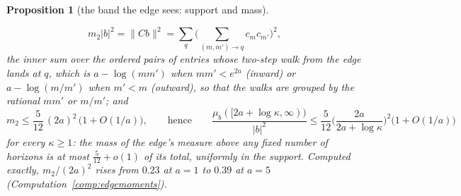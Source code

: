 \documentclass[11pt]{article}
\newtheorem{proposition}[theorem]{Proposition}
\theoremstyle{definition}
\theoremstyle{remark}
\begin{document}
\begin{proposition}[the band the edge sees: support and mass]
\begin{enumerate}
\[
m_2|b|^2=\|Cb\|^2=\sum_q\Big(\sum_{(m,m')\to q}c_mc_{m'}\Big)^2,
\]
the inner sum over the ordered pairs of entries whose two-step walk from the edge lands at $q$, which is $a-\log(mm')$ when $mm'<e^{2a}$ (inward) or $a-\log(m/m')$ when $m'<m$ (outward), so that the walks are grouped by the rational $mm'$ or $m/m'$; and
\[
m_2\le\frac5{12}\,(2a)^2\,\big(1+O(1/a)\big),\qquad\text{hence}\qquad\frac{\mu_b([2a+\log\kappa,\infty))}{|b|^2}\le\frac5{12}\Big(\frac{2a}{2a+\log\kappa}\Big)^2\big(1+O(1/a)\big)
\]
for every $\kappa\ge1$: the mass of the edge's measure above any fixed number of horizons is at most $\tfrac5{12}+o(1)$ of its total, uniformly in the support. Computed exactly, $m_2/(2a)^2$ rises from $0.23$ at $a=1$ to $0.39$ at $a=5$ (Computation~\ref{comp:edgemoments}).
\end{enumerate}
\end{proposition}
\end{document}
